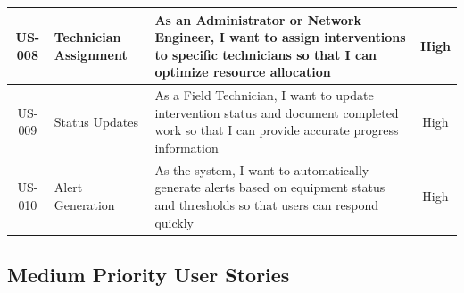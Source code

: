 \begin{longtable}{|c|p{2.8cm}|p{8.2cm}|c|}
\hline
US-008 & Technician Assignment & As an Administrator or Network Engineer, I want to assign interventions to specific technicians so that I can optimize resource allocation & High \\
\hline
US-009 & Status Updates & As a Field Technician, I want to update intervention status and document completed work so that I can provide accurate progress information & High \\
\hline
US-010 & Alert Generation & As the system, I want to automatically generate alerts based on equipment status and thresholds so that users can respond quickly & High \\
\hline
\end{longtable}

\subsection{Medium Priority User Stories}

